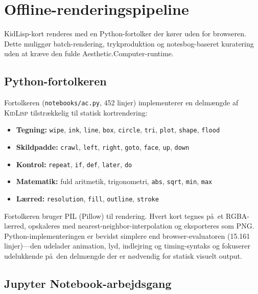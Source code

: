 \documentclass[10pt,letterpaper,twocolumn]{article}
\newcommand{\acdot}{{\color{acpink}.}}
\newcommand{\kidlisp}{\textsc{KidLisp}}
\begin{document}

\section{Offline-renderingspipeline}
\label{sec:pipeline}

KidLisp-kort renderes med en Python-fortolker der k\o rer uden for browseren. Dette muligg\o r batch-rendering, trykproduktion og notesbog-baseret kuratering uden at kr\ae ve den fulde Aesthetic\acdot Computer-runtime.

\subsection{Python-fortolkeren}

Fortolkeren (\texttt{notebooks/ac.py}, 452 linjer) implementerer en delm\ae ngde af \kidlisp{} tilstr\ae kkelig til statisk kortrendering:

\begin{itemize}
  \item \textbf{Tegning:} \texttt{wipe}, \texttt{ink}, \texttt{line}, \texttt{box}, \texttt{circle}, \texttt{tri}, \texttt{plot}, \texttt{shape}, \texttt{flood}
  \item \textbf{Skildpadde:} \texttt{crawl}, \texttt{left}, \texttt{right}, \texttt{goto}, \texttt{face}, \texttt{up}, \texttt{down}
  \item \textbf{Kontrol:} \texttt{repeat}, \texttt{if}, \texttt{def}, \texttt{later}, \texttt{do}
  \item \textbf{Matematik:} fuld aritmetik, trigonometri, \texttt{abs}, \texttt{sqrt}, \texttt{min}, \texttt{max}
  \item \textbf{L\ae rred:} \texttt{resolution}, \texttt{fill}, \texttt{outline}, \texttt{stroke}
\end{itemize}

Fortolkeren bruger PIL (Pillow) til rendering. Hvert kort tegnes p\aa\ et RGBA-l\ae rred, opskaleres med nearest-neighbor-interpolation og eksporteres som PNG. Python-implementeringen er bevidst simplere end browser-evaluatoren (15.161 linjer)---den udelader animation, lyd, indlejring og timing-syntaks og fokuserer udelukkende p\aa\ den delm\ae ngde der er n\o dvendig for statisk visuelt output.

\subsection{Jupyter Notebook-arbejdsgang}
\end{document}
